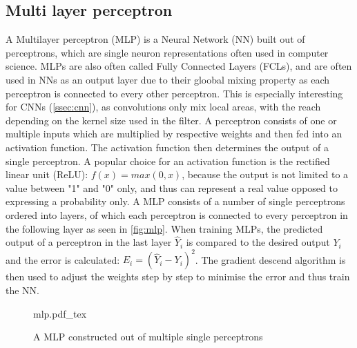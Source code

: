 \documentclass[journal]{IEEEtran}
\begin{document}
\subsection{Multi layer perceptron}
\label{sc:mlp}
A Multilayer perceptron (MLP) is a Neural Network (NN) built out of perceptrons, which are single neuron representations often used in computer science. MLPs are also often called Fully Connected Layers (FCLs), and are often used in NNs as an output layer due to their gloobal mixing property as each perceptron is connected to every other perceptron. This is especially interesting for CNNs (\autoref{ssec:cnn}), as convolutions only mix local areas, with the reach depending on the kernel size used in the filter. A perceptron consists of one or multiple inputs which are multiplied by respective weights and then fed into an activation function. The activation function then determines the output of a single perceptron. A popular choice for an activation function is the rectified linear unit (ReLU): $ f(x)=max(0, x) $, because the output is not limited to a value between "1" and "0" only, and thus can represent a real value opposed to expressing a probability only. A MLP consists of a number of single perceptrons ordered into layers, of which each perceptron is connected to every perceptron in the following layer as seen in \autoref{fig:mlp}. When training MLPs, the predicted output of a perceptron in the last layer $ \hat{Y}_i $ is compared to the desired output $ Y_i $ and the error is calculated: $ E_i = (\hat{Y}_i - Y_i)^{2} $. The gradient descend algorithm is then used to adjust the weights step by step to minimise the error and thus train the NN.

\begin{figure}[ht]
	\centering
	\def\svgwidth{\columnwidth}
	{mlp.pdf_tex}
	\caption[A MLP built out of multiple single perceptrons]{A MLP constructed out of multiple single perceptrons}
	\label{fig:mlp}
\end{figure}
\end{document}
